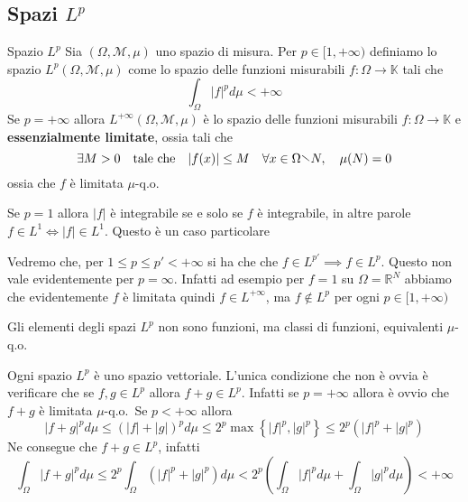 \subsection{Spazi \(L^{p}\) }
\begin{definition}{Spazio \(L^{p}\)}
    Sia \((\Omega, \mathcal{M}, \mu)\) uno spazio di misura. Per \(p \in [1,
    +\infty)\) definiamo lo spazio \(L^{p}(\Omega, \mathcal{M}, \mu)\) come lo
    spazio delle funzioni misurabili \(f : \Omega \to \mathbb{K}\) tali che
    \[
    \int_{\Omega} |f|^{p} d\mu < +\infty
    \]
    Se \(p = +\infty\) allora \(L^{+\infty}(\Omega, \mathcal{M}, \mu)\) è lo
    spazio delle funzioni misurabili \(f : \Omega \to \mathbb{K}\) e
    \textbf{essenzialmente limitate}, ossia tali che
    \[
        \exists M > 0 \quad \text{tale che} \quad |f(x)| \le M \quad
        \forall x \in \Omega \sminus N, \quad \mu(N) = 0
    \]
    ossia che \(f\) è limitata \(\mu\)-q.o.
\end{definition}
\begin{note}
    Se \(p=1\) allora \(|f|\) è integrabile se e solo se \(f\) è integrabile, in
    altre parole \(f \in L^{1} \iff |f| \in L^{1}\). Questo è un caso
    particolare
\end{note}
\begin{note}
    Vedremo che, per \(1 \le p \le p' < +\infty\) si ha che che \(f \in L^{p'}
    \implies f \in L^{p}\). Questo non vale evidentemente per \(p = \infty\).
    Infatti ad esempio per \(f = 1\) su \(\Omega = \mathbb{R}^{N}\) abbiamo che
    evidentemente \(f\) è limitata quindi \(f \in L^{+\infty}\), ma \(f \notin
    L^{p}\) per ogni \(p \in [1, +\infty)\) 
\end{note}
Gli elementi degli spazi \(L^{p}\) non sono funzioni, ma classi di funzioni,
equivalenti \(\mu\)-q.o.
\begin{remark}
    Ogni spazio \(L^{p}\) è uno spazio vettoriale. L'unica condizione che non è
    ovvia è verificare che se \(f, g \in L^{p}\) allora \(f+g \in L^{p}\).
    Infatti se \(p = +\infty\) allora è ovvio che \(f+g\) è limitata
    \(\mu\)-q.o.~Se \(p < +\infty\) allora 
    \[
    |f+g|^{p} d\mu \le {(|f| + |g|)}^{p} d\mu \le 2^{p}
    \max \left\{ |f|^{p}, |g|^{p} \right\} \le 2^{p} (|f|^{p} + |g|^{p})
    \]
    Ne consegue che \(f+g \in L^{p}\), infatti
    \[
        \int_{\Omega} |f+g|^{p} d\mu \le 2^{p} \int_{\Omega} (|f|^{p} + |g|^{p})
        d\mu < 2^{p} {\left( \int_\Omega |f|^{p} d\mu + \int_\Omega |g|^{p} d\mu
        \right)} < +\infty
    \]
\end{remark}
